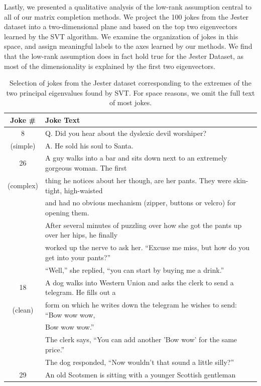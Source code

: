 \documentclass{article} %
\begin{document}
Lastly, we presented a qualitative analysis of the low-rank assumption
central to all of our matrix completion methods. We project the 100
jokes from the Jester dataset into a two-dimensional plane and based
on the top two eigenvectors learned by the SVT algorithm. We examine
the organization of jokes in this space, and assign meaningful labels
to the axes learned by our methods. We find that the low-rank
assumption does in fact hold true for the Jester Dataset, as most of
the dimensionality is explained by the first two eigenvectors.

\begin{table} [h]
  \caption{Selection of jokes from the Jester dataset corresponding to
    the extremes of the two principal eigenvalues found by SVT. For space reasons, we omit the full text of most jokes.}
\begin{tabular}{c | l}
\hline \hline
Joke \# & Joke Text \\ \hline
  8     & Q. Did you hear about the dyslexic devil worshiper? \\
(simple)& A. He sold his soul to Santa.\\ \hline
  26 & A guy walks into a bar and sits down next to an extremely
       gorgeous woman. The first \\
(complex)& thing he notices about her though, are her pants. They were
       skin-tight, high-waisted \\
     & and had no obvious mechanism (zipper, buttons or velcro) for opening them. \\
     & After several minutes of puzzling over how she got the pants up over
       her hips, he finally \\
     & worked up the nerve to ask her. ``Excuse me miss, but how do you get into your pants?'' \\ 
     & ``Well,'' she replied, ``you can start by buying me a drink.''\\ \hline
  18 & A dog walks into Western Union and asks the clerk to send a
       telegram. He fills out a \\
(clean)& form on which he writes down the telegram he wishes to send:
       ``Bow wow wow, \\
     &  Bow wow wow.'' \\
     & The clerk says, ``You can add another 'Bow wow' for the same
       price.''\\
     & The dog responded, ``Now wouldn't that sound a little silly?''\\ \hline
  29 & An old Scotsmen is sitting with a younger Scottish gentleman

\end{tabular}
\end{table}
\end{document}
